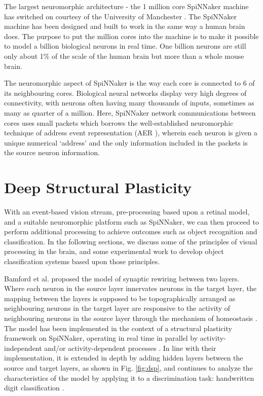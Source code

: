 \documentclass[letterpaper, 10 pt, conference]{ieeeconf}  %
\begin{document}
The largest neuromorphic architecture - the 1 million core SpiNNaker machine has switched on courtesy of the University of Manchester \cite{Furber2020}. 
The SpiNNaker machine has been designed and built to work in the same way a human brain does. 
The purpose to put the million cores into the machine is to make it possible to model a billion biological neurons in real time. 
One billion neurons are still only about 1\% of the scale of the human brain but more than a whole mouse brain.

The neuromorphic aspect of SpiNNaker is the way each core is connected to 6 of its neighbouring cores. Biological neural networks display very high degrees of connectivity, with neurons often having many thousands of inputs, sometimes as many as quarter of a million. 
Here, SpiNNaker network communications between cores uses small packets which borrows the well-established neuromorphic technique of address event representation (AER \cite{Mahowald1992}), wherein each neuron is given a unique numerical ‘address’ and the only information included in the packets is the source neuron information.


\section{Deep Structural Plasticity}

With an event-based vision stream, pre-processing based upon a retinal model, and a suitable neuromorphic platform such as SpiNNaker, we can then proceed to perform additional processing to achieve outcomes such as object recognition and classification. In the following sections, we discuss some of the principles of visual processing in the brain, and some experimental work to develop object classification systems based upon those principles.

Bamford et al. \cite{bamford2010synaptic} proposed the model of synaptic rewiring between two layers. 
Where each neuron in the source layer innervates neurons in the target layer, the mapping between the layers is supposed to be topographically arranged as neighbouring neurons in the target layer are responsive to the activity of neighbouring neurons in the source layer \cite{udin1988formation} through the mechanism of homeostasis \cite{Butz2009}. 
The model has been implemented in the context of a structural plasticity framework on SpiNNaker, operating in real time in parallel by activity-independent and/or activity-dependent processes \cite{bogdan2018structural}.
In line with their implementation, it is extended in depth by adding hidden layers between the source and target layers, as shown in Fig. \ref{fig:dsp}, and continues to analyze the characteristics of the model by applying it to a discrimination task: handwritten digit classification \cite{hopkins2018spiking}.
\end{document}
